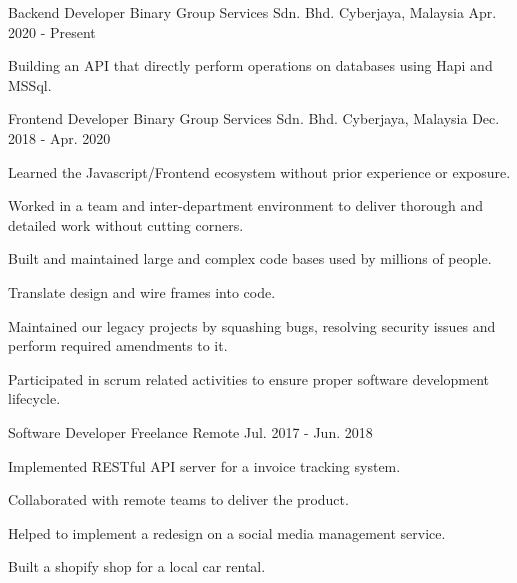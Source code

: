

\begin{cventries}

  \cventry
    {Backend Developer} %
    {Binary Group Services Sdn. Bhd.} %
    {Cyberjaya, Malaysia} %
    {Apr. 2020 - Present} %
    {
      \begin{cvitems} %
        \item {Building an API that directly perform operations on databases using Hapi and MSSql.}
      \end{cvitems}
    }

  \cventry
    {Frontend Developer} %
    {Binary Group Services Sdn. Bhd.} %
    {Cyberjaya, Malaysia} %
    {Dec. 2018 - Apr. 2020} %
    {
      \begin{cvitems} %
        \item {Learned the Javascript/Frontend ecosystem without prior experience or exposure.}
        \item {Worked in a team and inter-department environment to deliver thorough and detailed work without cutting corners.}
        \item {Built and maintained large and complex code bases used by millions of people.}
        \item {Translate design and wire frames into code.}
        \item {Maintained our legacy projects by squashing bugs, resolving security issues and perform required amendments to it.}
        \item {Participated in scrum related activities to ensure proper software development lifecycle.}
      \end{cvitems}
    }

  \cventry
    {Software Developer} %
    {Freelance} %
    {Remote} %
    {Jul. 2017 - Jun. 2018} %
    {
      \begin{cvitems} %
        \item {Implemented RESTful API server for a invoice tracking system.}
        \item {Collaborated with remote teams to deliver the product.}
        \item {Helped to implement a redesign on a social media management service.}
        \item {Built a shopify shop for a local car rental.}
      \end{cvitems}
    }
\end{cventries}
